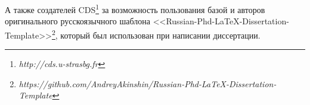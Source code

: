 А также создателей CDS\footnote{\textit{http://cds.u-strasbg.fr}} за возможность пользования базой и авторов оригинального русскоязычного шаблона <<Russian-Phd-LaTeX-Dissertation-Template>>\footnote{\textit{https://github.com/AndreyAkinshin/Russian-Phd-LaTeX-Dissertation-Template}}, который был использован при написании диссертации.
